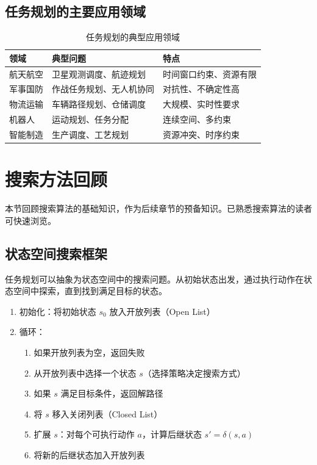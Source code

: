 \subsection{任务规划的主要应用领域}

\begin{table}[htbp]
\centering
\caption{任务规划的典型应用领域}
\begin{tabular}{p{3cm}p{4cm}p{5cm}}
\toprule
\textbf{领域} & \textbf{典型问题} & \textbf{特点} \\
\midrule
航天航空 & 卫星观测调度、航迹规划 & 时间窗口约束、资源有限 \\
军事国防 & 作战任务规划、无人机协同 & 对抗性、不确定性高 \\
物流运输 & 车辆路径规划、仓储调度 & 大规模、实时性要求 \\
机器人 & 运动规划、任务分配 & 连续空间、多约束 \\
智能制造 & 生产调度、工艺规划 & 资源冲突、时序约束 \\
\bottomrule
\end{tabular}
\end{table}

\section{搜索方法回顾}

\begin{levelbox}
本节回顾搜索算法的基础知识，作为后续章节的预备知识。已熟悉搜索算法的读者可快速浏览。
\end{levelbox}

\subsection{状态空间搜索框架}

任务规划可以抽象为状态空间中的搜索问题。从初始状态出发，通过执行动作在状态空间中探索，直到找到满足目标的状态。

\begin{algbox}[通用状态空间搜索框架]
\begin{enumerate}
  \item 初始化：将初始状态 $s_0$ 放入开放列表（Open List）
  \item 循环：
  \begin{enumerate}
    \item 如果开放列表为空，返回失败
    \item 从开放列表中选择一个状态 $s$（选择策略决定搜索方式）
    \item 如果 $s$ 满足目标条件，返回解路径
    \item 将 $s$ 移入关闭列表（Closed List）
    \item 扩展 $s$：对每个可执行动作 $a$，计算后继状态 $s' = \delta(s, a)$
    \item 将新的后继状态加入开放列表
  \end{enumerate}
\end{enumerate}
\end{algbox}

